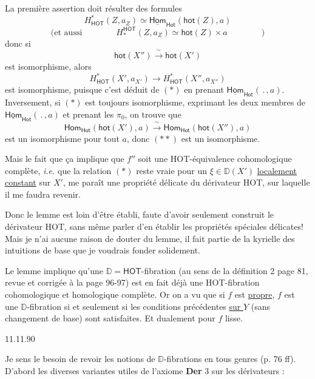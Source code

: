 \documentclass[11pt]{article}
\newcommand{\printedpage}[1]{\marginpar{\footnotesize p.~#1}}
\newcommand{\msp}[1]{\marginpar{\footnotesize [#1]}}
\newcommand{\HOT}{\textsf{HOT}}
\newcommand{\DD}{\mathbb{D}}
\begin{document}
La première assertion doit résulter des formules
\[ H^{*}_{\mathsf{HOT}}(Z,a_Z) \simeq \underline{\mathsf{Hom}}_{\mathsf{Hot}}(\mathsf{hot}(Z),a) \tag*{$(*)$} \]
\[ \text{(et aussi} \qquad\qquad H_{*}^{\mathsf{HOT}}(Z,a_Z) \simeq \mathsf{hot}(Z) \times a \qquad\qquad ) \]
donc si
\[ \mathsf{hot}(X'') \xrightarrow{\ \sim\ } \mathsf{hot}(X') \tag*{$(**)$} \]
est isomorphisme, alors
\[ H^{*}_{\mathsf{HOT}}(X', a_{X'}) \longrightarrow H^{*}_{\mathsf{HOT}}(X'', a_{X''}) \]
est isomorphisme, puisque c'est déduit de $(*)$ en prenant $\underline{\mathsf{Hom}}_{\mathsf{Hot}}(\,.\,,a)$. Inversement, si $(*)$ est toujours isomorphisme, exprimant les deux membres de $\underline{\mathsf{Hom}}_{\mathsf{Hot}}(\,.\,,a)$ et prenant les $\pi_0$, on trouve que
\[ \mathsf{Hom}_{\mathsf{Hot}}(\mathsf{hot}(X'),a) \xrightarrow{\ \sim\ } \mathsf{Hom}_{\mathsf{Hot}}(\mathsf{hot}(X''),a) \]
est un isomorphisme pour tout $a$, donc $(**)$ est un isomorphisme.

Mais le fait que ça implique que $f''$ soit une \HOT-équivalence cohomologique complète, \textit{i.e.} que la relation $(*)$ reste vraie pour un $\xi \in \DD(X')$ \underline{localement} \underline{constant} sur $X'$, me paraît une propriété délicate du dérivateur \HOT, sur laquelle il me faudra revenir.

Donc le lemme est loin d'être établi, faute d'avoir seulement construit le dérivateur \HOT, sans même parler d'en établir les propriétés spéciales délicates! Mais je n'ai aucune raison de douter du lemme, il fait partie de la kyrielle des intuitions de base que je voudrais fonder solidement.

\printedpage{66}

\msp{page 111}

Le lemme implique qu'une $\DD = \mathsf{HOT}$-fibration (au sens de la définition 2 page 81, revue et corrigée à la page 96-97) est en fait déjà une \HOT-fibration cohomologique et homologique complète. Or on a vu que si $f$ est \underline{propre}, $f$ est une $\DD$-fibration si et seulement si les conditions précédentes \underline{sur $Y$} (sans changement de base) sont satisfaites. Et dualement pour $f$ lisse.

\begin{flushright}
11.11.90
\end{flushright}

Je sens le besoin de revoir les notions de $\DD$-fibrations en tous genres (p. 76 ff). D'abord les diverses variantes utiles de l'axiome \textbf{Der} 3 sur les dérivateurs :
\end{document}
